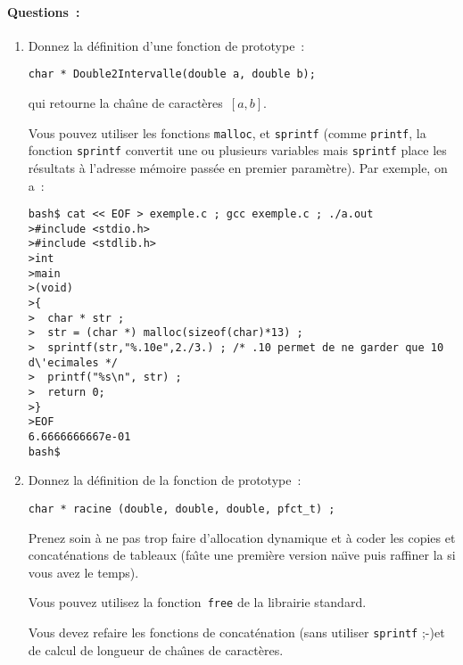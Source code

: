 \paragraph{Questions~:}
\begin{enumerate}
\item Donnez la d\'efinition d'une fonction de prototype~:
\begin{verbatim}
char * Double2Intervalle(double a, double b);
\end{verbatim}
  qui retourne la cha\^\i{}ne de caract\`eres~$[a,b]$.
\par
Vous pouvez utiliser les fonctions \verb+malloc+, et \verb+sprintf+ (comme \verb+printf+,  la fonction \verb+sprintf+ convertit une ou plusieurs
variables mais \verb+sprintf+ place les
r\'esultats \`a l'adresse m\'emoire pass\'ee en premier
param\`etre). Par exemple, on a~:
\begin{verbatim}
bash$ cat << EOF > exemple.c ; gcc exemple.c ; ./a.out 
>#include <stdio.h>
>#include <stdlib.h>
>int
>main
>(void) 
>{
>  char * str ;
>  str = (char *) malloc(sizeof(char)*13) ;
>  sprintf(str,"%.10e",2./3.) ; /* .10 permet de ne garder que 10 d\'ecimales */
>  printf("%s\n", str) ;
>  return 0;
>}
>EOF 
6.6666666667e-01
bash$
\end{verbatim}
\item Donnez la d\'efinition de la fonction de prototype~:
\begin{verbatim}
char * racine (double, double, double, pfct_t) ;
\end{verbatim}
Prenez soin \`a ne pas trop faire d'allocation dynamique et \`a coder
les copies et concat\'enations de tableaux (fa\^\i{}te une premi\`ere
version na\"\i{}ve puis raffiner la si vous avez le temps).
\par
Vous pouvez utilisez la fonction~\verb+free+ de la librairie standard.
\par
Vous devez refaire les fonctions de concat\'enation (sans utiliser \verb+sprintf+ ;-)et de calcul de longueur de cha\^\i{}nes
de caract\`eres.
\end{enumerate}
\par
\ifcorrection%
